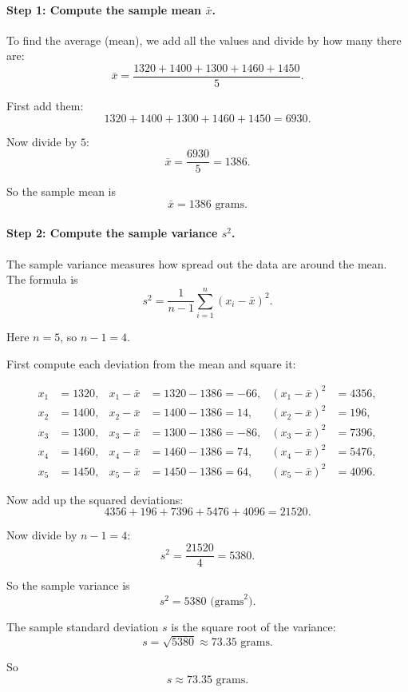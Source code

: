 \documentclass[11pt,letterpaper]{article}
\theoremstyle{remark}
\begin{document}
\paragraph{Step 1: Compute the sample mean $\bar{x}$.}

To find the average (mean), we add all the values and divide by how many there are:
\[
\bar{x} = \frac{1320 + 1400 + 1300 + 1460 + 1450}{5}.
\]

First add them:
\[
1320 + 1400 + 1300 + 1460 + 1450 = 6930.
\]

Now divide by $5$:
\[
\bar{x} = \frac{6930}{5} = 1386.
\]

So the sample mean is
\[
\boxed{\bar{x} = 1386 \text{ grams}.}
\]

\paragraph{Step 2: Compute the sample variance $s^2$.}

The sample variance measures how spread out the data are around the mean.
The formula is
\[
s^2 = \frac{1}{n-1}\sum_{i=1}^n (x_i - \bar{x})^2.
\]

Here $n = 5$, so $n-1 = 4$.

First compute each deviation from the mean and square it:

\[
\begin{aligned}
x_1 &= 1320, & x_1 - \bar{x} &= 1320 - 1386 = -66, & (x_1 - \bar{x})^2 &= 4356, \\
x_2 &= 1400, & x_2 - \bar{x} &= 1400 - 1386 = 14, & (x_2 - \bar{x})^2 &= 196, \\
x_3 &= 1300, & x_3 - \bar{x} &= 1300 - 1386 = -86, & (x_3 - \bar{x})^2 &= 7396, \\
x_4 &= 1460, & x_4 - \bar{x} &= 1460 - 1386 = 74, & (x_4 - \bar{x})^2 &= 5476, \\
x_5 &= 1450, & x_5 - \bar{x} &= 1450 - 1386 = 64, & (x_5 - \bar{x})^2 &= 4096.
\end{aligned}
\]

Now add up the squared deviations:
\[
4356 + 196 + 7396 + 5476 + 4096 = 21520.
\]

Now divide by $n-1 = 4$:
\[
s^2 = \frac{21520}{4} = 5380.
\]

So the sample variance is
\[
\boxed{s^2 = 5380 \text{ (grams}^2\text{)}.}
\]

The sample standard deviation $s$ is the square root of the variance:
\[
s = \sqrt{5380} \approx 73.35 \text{ grams.}
\]

So
\[
\boxed{s \approx 73.35 \text{ grams.}}
\]
\end{document}
